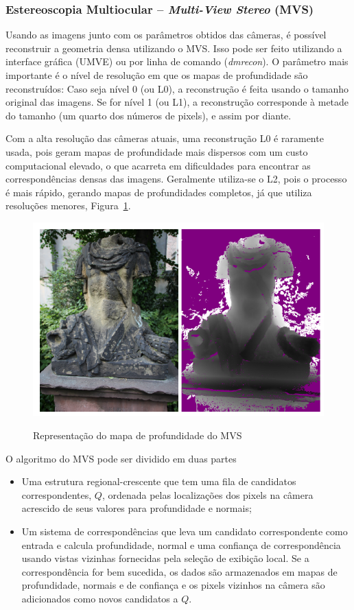 \subsubsection{Estereoscopia Multiocular -- \emph{Multi-View Stereo} (MVS)}

Usando as imagens junto com os parâmetros obtidos das câmeras, é possível
reconstruir a geometria densa utilizando o MVS. Isso pode ser feito utilizando a
interface gráfica (UMVE) ou por linha de comando (\emph{dmrecon}).
O parâmetro mais importante é o nível de resolução em que os mapas de
profundidade são reconstruídos: Caso seja nível 0 (ou L0), a reconstrução é
feita usando o tamanho original das imagens. Se for nível 1 (ou L1), a
reconstrução corresponde à metade do tamanho (um quarto dos números de pixels),
e assim por diante.

Com a alta resolução das câmeras atuais, uma reconstrução L0 é raramente usada, pois
geram mapas de profundidade mais dispersos com um custo computacional elevado, o
que acarreta em dificuldades para encontrar as correspondências densas das
imagens. Geralmente utiliza-se o L2, pois o processo é mais rápido, gerando
mapas de profundidades completos, já que utiliza resoluções menores, Figura~\ref{fig:mvedepth}.

\begin{figure}[!h]
	\centering
	\caption{Representação do mapa de profundidade do MVS}
	\includegraphics[width=0.7\linewidth]{figs/mvedepth.png}
   \label{fig:mvedepth}
\end{figure}

O algoritmo do MVS pode ser dividido em duas partes

\begin{itemize}
\item {Uma estrutura regional-crescente que tem uma fila de candidatos
  correspondentes, $Q$, ordenada pelas localizações dos pixels na câmera
acrescido de seus valores para profundidade e normais;}
\item {Um sistema de correspondências que leva um candidato correspondente como
  entrada e calcula profundidade, normal e uma confiança de correspondência
usando vistas vizinhas fornecidas pela seleção de exibição local. Se a
correspondência for bem sucedida, os dados são armazenados em mapas de
profundidade, normais e de confiança e os pixels vizinhos na câmera são
adicionados como novos candidatos a $Q$.}
\end{itemize}

